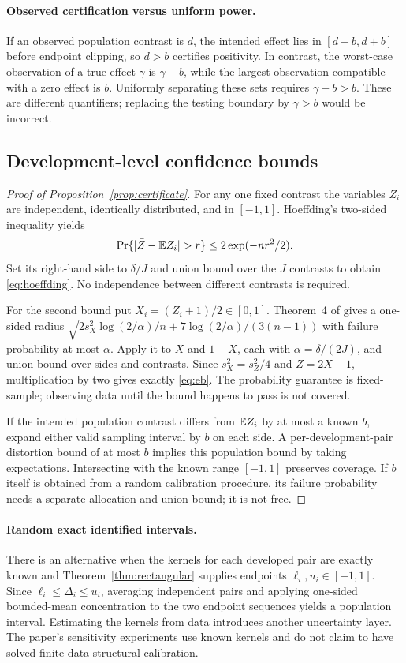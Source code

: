 \paragraph{Observed certification versus uniform power.}
If an observed population contrast is $d$, the intended effect lies in $[d-b,d+b]$ before endpoint clipping, so $d>b$ certifies positivity. In contrast, the worst-case observation of a true effect $\gamma$ is $\gamma-b$, while the largest observation compatible with a zero effect is $b$. Uniformly separating these sets requires $\gamma-b>b$. These are different quantifiers; replacing the testing boundary by $\gamma>b$ would be incorrect.

\subsection{Development-level confidence bounds}
\begin{proof}[Proof of Proposition~\ref{prop:certificate}]
For any one fixed contrast the variables $Z_i$ are independent, identically distributed, and in $[-1,1]$. Hoeffding's two-sided inequality yields
\[
 \Pr\{|\bar Z-\E Z_i|>r\}\leq2\exp(-nr^2/2).
\]
Set its right-hand side to $\delta/J$ and union bound over the $J$ contrasts to obtain \eqref{eq:hoeffding}. No independence between different contrasts is required.

For the second bound put $X_i=(Z_i+1)/2\in[0,1]$. Theorem~4 of \citet{maurer} gives a one-sided radius
$\sqrt{2s_X^2\log(2/\alpha)/n}+7\log(2/\alpha)/(3(n-1))$
with failure probability at most $\alpha$. Apply it to $X$ and $1-X$, each with $\alpha=\delta/(2J)$, and union bound over sides and contrasts. Since $s_X^2=s_Z^2/4$ and $Z=2X-1$, multiplication by two gives exactly \eqref{eq:eb}. The probability guarantee is fixed-sample; observing data until the bound happens to pass is not covered.

If the intended population contrast differs from $\mathbb E Z_i$ by at most a known $b$, expand either valid sampling interval by $b$ on each side. A per-development-pair distortion bound of at most $b$ implies this population bound by taking expectations. Intersecting with the known range $[-1,1]$ preserves coverage. If $b$ itself is obtained from a random calibration procedure, its failure probability needs a separate allocation and union bound; it is not free.
\end{proof}

\paragraph{Random exact identified intervals.}
There is an alternative when the kernels for each developed pair are exactly known and Theorem~\ref{thm:rectangular} supplies endpoints $\ell_i,u_i\in[-1,1]$. Since $\ell_i\leq\Delta_i\leq u_i$, averaging independent pairs and applying one-sided bounded-mean concentration to the two endpoint sequences yields a population interval. Estimating the kernels from data introduces another uncertainty layer. The paper's sensitivity experiments use known kernels and do not claim to have solved finite-data structural calibration.


